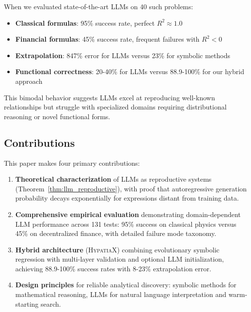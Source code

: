 \documentclass[twoside,11pt]{article}
\begin{document}
When we evaluated state-of-the-art LLMs \citep{openai2023gpt4,anthropic2024claude} on 40 such problems:
\begin{itemize}
\item \textbf{Classical formulas}: 95\% success rate, perfect $R^2 \approx 1.0$
\item \textbf{Financial formulas}: 45\% success rate, frequent failures with $R^2 < 0$
\item \textbf{Extrapolation}: 847\% error for LLMs versus 23\% for symbolic methods
\item \textbf{Functional correctness}: 20-40\% for LLMs versus 88.9-100\% for our hybrid approach
\end{itemize}

This bimodal behavior suggests LLMs excel at reproducing well-known relationships but struggle with specialized domains requiring distributional reasoning or novel functional forms.

\subsection{Contributions}

This paper makes four primary contributions:

\begin{enumerate}
\item \textbf{Theoretical characterization} of LLMs as reproductive systems (Theorem~\ref{thm:llm_reproductive}), with proof that autoregressive generation probability decays exponentially for expressions distant from training data.

\item \textbf{Comprehensive empirical evaluation} demonstrating domain-dependent LLM performance across 131 tests: 95\% success on classical physics versus 45\% on decentralized finance, with detailed failure mode taxonomy.

\item \textbf{Hybrid architecture} (\textsc{HypatiaX}) combining evolutionary symbolic regression with multi-layer validation and optional LLM initialization, achieving 88.9-100\% success rates with 8-23\% extrapolation error.

\item \textbf{Design principles} for reliable analytical discovery: symbolic methods for mathematical reasoning, LLMs for natural language interpretation and warm-starting search.
\end{enumerate}
\end{document}

